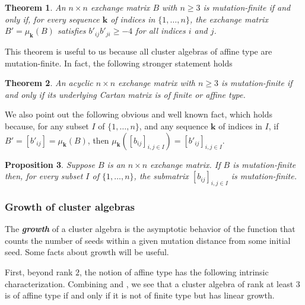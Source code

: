 \documentclass{amsart}
\newtheorem{proposition}{Proposition}[section]
\newtheorem{theorem}[proposition]{Theorem}
\theoremstyle{definition}
\theoremstyle{remark}
\numberwithin{equation}{section}
\newcommand{\newword}[1]{\textbf{\emph{#1}}}
\newcommand{\set}[1]{{\lbrace #1 \rbrace}}
\newcommand{\0}{{\mathbf{0}}}
\newcommand{\kk}{{\boldsymbol{k}}}
\begin{document}
\begin{theorem}\label{mut fin 2x2}
An $n\times n$ exchange matrix $B$ with $n\ge3$ is mutation-finite if and only if, for every sequence $\kk$ of indices in $\set{1,\ldots,n}$, the exchange matrix $B'=\mu_\kk(B)$ satisfies $b'_{ij}b'_{ji}\ge-4$ for all indices $i$ and $j$.
\end{theorem}

This theorem is useful to us because all cluster algebras of affine type are mutation-finite.
In fact, the following stronger statement holds \cite[Theorem~3.5]{Seven} 

\begin{theorem}\label{acyc mut fin}
An acyclic $n\times n$ exchange matrix with $n\ge3$ is mutation-finite if and only if its underlying Cartan matrix is of finite or affine type.
\end{theorem}

We also point out the following obvious and well known fact, which holds because, for any subset $I$ of $\set{1,\ldots,n}$, and any sequence $\kk$ of indices in $I$, if $B'=[b'_{ij}]=\mu_\kk(B)$, then $\mu_\kk([b_{ij}]_{i,j\in I})=[b'_{ij}]_{i,j\in I}$.

\begin{proposition}\label{mut fin sub}
Suppose $B$ is an $n\times n$ exchange matrix.
If $B$ is mutation-finite then, for every subset $I$ of $\set{1,\ldots,n}$, the submatrix $[b_{ij}]_{i,j\in I}$ is mutation-finite.
\end{proposition}

\subsubsection{Growth of cluster algebras}\label{growth sec}
The \newword{growth} of a cluster algebra is the asymptotic behavior of the function that counts the number of seeds within a given mutation distance from some initial seed.
Some facts about growth will be useful.

First, beyond rank $2$, the notion of affine type has the following intrinsic characterization.
Combining \cite[Theorem~3.5]{Seven} and \cite[Theorem~1.1]{FeShThTu12}, we see that a cluster algebra of rank at least $3$ is of affine type if and only if it is not of finite type but has linear growth.
\end{document}
